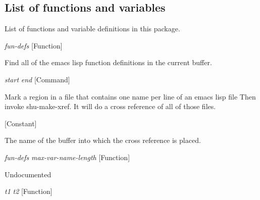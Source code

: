 \subsection{List of functions and variables}

List of functions and variable definitions in this package.



\vspace{1em}
\noindent
{}
\usebox{\funcname}\emph{fun-defs}
 \hfill [Function]

\begin{doc-string}
Find all of the emacs lisp function definitions in the current buffer.
\end{doc-string}

\vspace{1em}
\noindent
{}
\usebox{\funcname}\emph{start} \emph{end}
 \hfill [Command]

\begin{doc-string}
Mark a region in a file that contains one name per line of an emacs lisp file
Then invoke shu-make-xref.  It will do a cross reference of all of those files.
\end{doc-string}

\vspace{1em}
\noindent
{}
\usebox{\funcname}
 \hfill [Constant]

\begin{doc-string}
The name of the buffer into which the cross reference is placed.
\end{doc-string}

\vspace{1em}
\noindent
{}
\usebox{\funcname}\emph{fun-defs} \emph{max-var-name-length}
 \hfill [Function]
\hspace*{\wd\funcname}

\begin{doc-string}
Undocumented
\end{doc-string}

\vspace{1em}
\noindent
{}
\usebox{\funcname}\emph{t1} \emph{t2}
 \hfill [Function]

